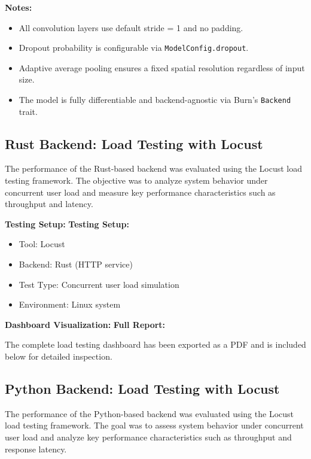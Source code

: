 \documentclass[10pt,a4paper,twocolumn]{article}
\begin{document}
\noindent\textbf{Notes:}
\begin{itemize}
  \item All convolution layers use default stride = 1 and no padding.
  \item Dropout probability is configurable via \texttt{ModelConfig.dropout}.
  \item Adaptive average pooling ensures a fixed spatial resolution regardless of input size.
  \item The model is fully differentiable and backend-agnostic via Burn's \texttt{Backend} trait.
\end{itemize}


\subsection{Rust Backend: Load Testing with Locust}

The performance of the Rust-based backend was evaluated using the Locust load testing framework. The objective was to analyze system behavior under concurrent user load and measure key performance characteristics such as throughput and latency.

\textbf{Testing Setup:}
\textbf{Testing Setup:}
\begin{itemize}
    \item Tool: Locust
    \item Backend: Rust (HTTP service)
    \item Test Type: Concurrent user load simulation
    \item Environment: Linux system
\end{itemize}

\textbf{Dashboard Visualization:}
\textbf{Full Report:}

The complete load testing dashboard has been exported as a PDF and is included below for detailed inspection.




\subsection{Python Backend: Load Testing with Locust}

The performance of the Python-based backend was evaluated using the Locust load testing framework. The goal was to assess system behavior under concurrent user load and analyze key performance characteristics such as throughput and response latency.
\end{document}

